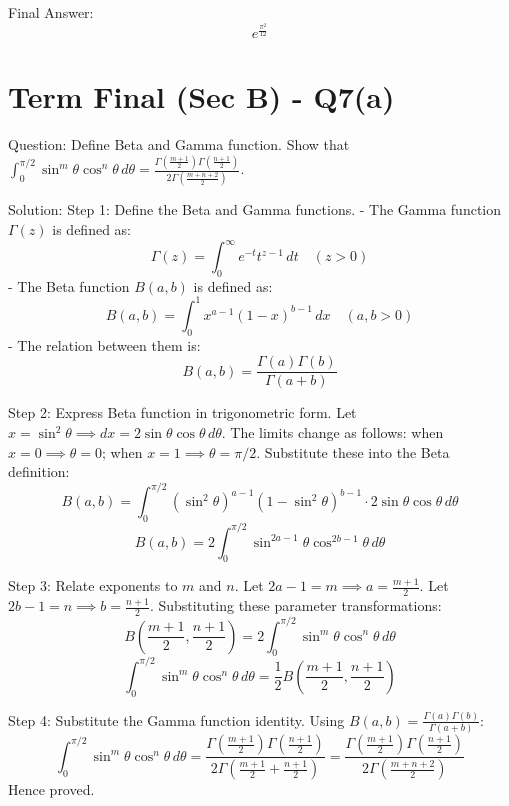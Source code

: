 \documentclass{article}
\begin{document}
Final Answer:
\[
\boxed{e^{\frac{\pi^2}{12}}}
\]

\section*{Term Final (Sec B) - Q7(a)}
Question:
Define Beta and Gamma function. Show that $\int_0^{\pi/2} \sin^m \theta \cos^n \theta \, d\theta = \frac{\Gamma\left(\frac{m+1}{2}\right) \Gamma\left(\frac{n+1}{2}\right)}{2 \Gamma\left(\frac{m+n+2}{2}\right)}$.

Solution:
Step 1: Define the Beta and Gamma functions.
- The Gamma function $\Gamma(z)$ is defined as:
  \[
  \Gamma(z) = \int_0^\infty e^{-t} t^{z-1} \, dt \quad (z > 0)
  \]
- The Beta function $B(a, b)$ is defined as:
  \[
  B(a, b) = \int_0^1 x^{a-1} (1-x)^{b-1} \, dx \quad (a, b > 0)
  \]
- The relation between them is:
  \[
  B(a, b) = \frac{\Gamma(a)\Gamma(b)}{\Gamma(a+b)}
  \]

Step 2: Express Beta function in trigonometric form.
Let $x = \sin^2\theta \implies dx = 2\sin\theta\cos\theta \, d\theta$.
The limits change as follows: when $x=0 \implies \theta=0$; when $x=1 \implies \theta=\pi/2$.
Substitute these into the Beta definition:
\[
B(a, b) = \int_0^{\pi/2} (\sin^2\theta)^{a-1} (1-\sin^2\theta)^{b-1} \cdot 2\sin\theta\cos\theta \, d\theta
\]
\[
B(a, b) = 2 \int_0^{\pi/2} \sin^{2a-1}\theta \cos^{2b-1}\theta \, d\theta
\]

Step 3: Relate exponents to $m$ and $n$.
Let $2a-1 = m \implies a = \frac{m+1}{2}$.
Let $2b-1 = n \implies b = \frac{n+1}{2}$.
Substituting these parameter transformations:
\[
B\left(\frac{m+1}{2}, \frac{n+1}{2}\right) = 2 \int_0^{\pi/2} \sin^m\theta \cos^n\theta \, d\theta
\]
\[
\int_0^{\pi/2} \sin^m\theta \cos^n\theta \, d\theta = \frac{1}{2} B\left(\frac{m+1}{2}, \frac{n+1}{2}\right)
\]

Step 4: Substitute the Gamma function identity.
Using $B(a, b) = \frac{\Gamma(a)\Gamma(b)}{\Gamma(a+b)}$:
\[
\int_0^{\pi/2} \sin^m\theta \cos^n\theta \, d\theta = \frac{\Gamma\left(\frac{m+1}{2}\right)\Gamma\left(\frac{n+1}{2}\right)}{2\Gamma\left(\frac{m+1}{2} + \frac{n+1}{2}\right)} = \frac{\Gamma\left(\frac{m+1}{2}\right)\Gamma\left(\frac{n+1}{2}\right)}{2\Gamma\left(\frac{m+n+2}{2}\right)}
\]
Hence proved.
\end{document}
